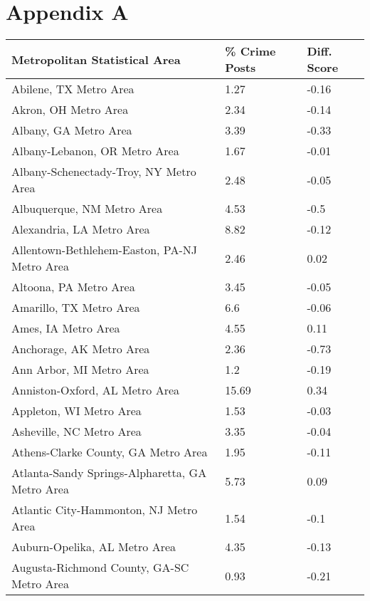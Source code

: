 \documentclass[12pt,oneside, letterpaper]{book}
\begin{document}
\newpage
\chapter*{Appendix A}

\begin{longtable}{| p{} | p{} | p{} |}
    \hline
    Metropolitan Statistical Area & \% Crime Posts & Diff. Score \\ \hline
    Abilene, TX Metro Area & 1.27 & -0.16 \\ \hline
    Akron, OH Metro Area & 2.34 & -0.14 \\ \hline
    Albany, GA Metro Area & 3.39 & -0.33 \\ \hline
    Albany-Lebanon, OR Metro Area & 1.67 & -0.01 \\ \hline
    Albany-Schenectady-Troy, NY Metro Area & 2.48 & -0.05 \\ \hline
    Albuquerque, NM Metro Area & 4.53 & -0.5 \\ \hline
    Alexandria, LA Metro Area & 8.82 & -0.12 \\ \hline
    Allentown-Bethlehem-Easton, PA-NJ Metro Area & 2.46 & 0.02 \\ \hline
    Altoona, PA Metro Area & 3.45 & -0.05 \\ \hline
    Amarillo, TX Metro Area & 6.6 & -0.06 \\ \hline
    Ames, IA Metro Area & 4.55 & 0.11 \\ \hline
    Anchorage, AK Metro Area & 2.36 & -0.73 \\ \hline
    Ann Arbor, MI Metro Area & 1.2 & -0.19 \\ \hline
    Anniston-Oxford, AL Metro Area & 15.69 & 0.34 \\ \hline
    Appleton, WI Metro Area & 1.53 & -0.03 \\ \hline
    Asheville, NC Metro Area & 3.35 & -0.04 \\ \hline
    Athens-Clarke County, GA Metro Area & 1.95 & -0.11 \\ \hline
    Atlanta-Sandy Springs-Alpharetta, GA Metro Area & 5.73 & 0.09 \\ \hline
    Atlantic City-Hammonton, NJ Metro Area & 1.54 & -0.1 \\ \hline
    Auburn-Opelika, AL Metro Area & 4.35 & -0.13 \\ \hline
    Augusta-Richmond County, GA-SC Metro Area & 0.93 & -0.21 \\ \hline

\end{longtable}
\end{document}
